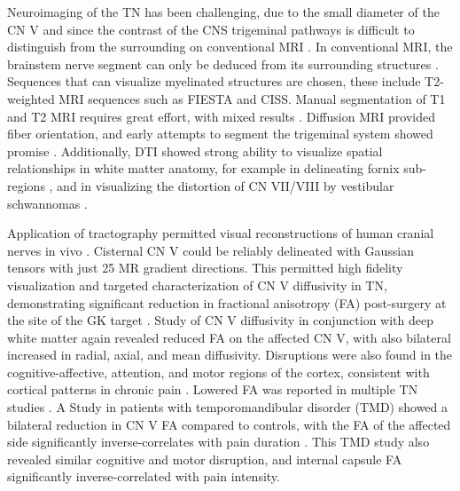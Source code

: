 Neuroimaging of the TN has been challenging, due to the small diameter of the CN V and since the contrast of the CNS trigeminal pathways is difficult to distinguish from the surrounding on conventional MRI \cite{Borges2010}. In conventional MRI, the brainstem nerve segment can only be deduced from its surrounding structures \cite{Casselman2008}. Sequences that can visualize myelinated structures are chosen, these include T2-weighted MRI  sequences such as FIESTA and CISS. Manual segmentation of T1 and T2 MRI requires great effort, with mixed results \cite{Miller2008a}. Diffusion MRI provided fiber orientation, and early attempts to segment the trigeminal system showed promise \cite{Upadhyay2008,Habas2007f}. Additionally, DTI showed strong ability to visualize spatial relationships in white matter anatomy, for example in delineating fornix sub-regions \cite{Chen2015c}, and in visualizing the distortion of CN VII/VIII by vestibular schwannomas \cite{Chen2011b}.  

Application of tractography permitted visual reconstructions of human cranial nerves in vivo \cite{Hodaie2010}. Cisternal CN V could be reliably delineated with Gaussian tensors with just 25 MR gradient directions. This permitted high fidelity visualization and targeted characterization of CN V diffusivity in TN, demonstrating significant reduction in fractional anisotropy (FA) post-surgery at the site of the GK target \cite{Hodaie2009a}. Study of CN V diffusivity in conjunction with deep white matter again revealed reduced FA on the affected CN V, with also bilateral increased in radial, axial, and mean diffusivity. Disruptions were also found in the cognitive-affective, attention, and motor regions of the cortex, consistent with cortical patterns in chronic pain \cite{Desouza2013}. Lowered FA was reported in multiple TN studies \cite{Herweh2007, Lutz2011}. A Study in patients with temporomandibular disorder (TMD) showed a bilateral reduction in CN V FA compared to controls, with the FA of the affected side significantly inverse-correlates with pain duration \cite{Moayedi2012}. This TMD study also revealed similar cognitive and motor disruption, and internal capsule FA significantly inverse-correlated with pain intensity. 